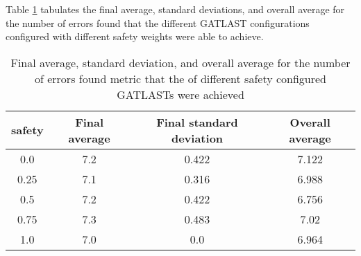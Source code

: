 Table \ref{tab:HP:GA:Safety:number of errors found} tabulates the final average, standard deviations, and overall average for the number of errors found that the different GATLAST configurations configured with different safety weights were able to achieve.
\begin{table}[tbh!]
\centering
\begin{adjustbox}{trim=0cm 0cm 0cm 0cm, clip=true}
\begin{tabular}{|c|c|c|c|}
\hline
safety & Final average & Final standard deviation & Overall average\\
\hline
0.0 & 7.2 & 0.422 & 7.122\\\hline
0.25 & 7.1 & 0.316 & 6.988\\\hline
0.5 & 7.2 & 0.422 & 6.756\\\hline
0.75 & 7.3 & 0.483 & 7.02\\\hline
1.0 & 7.0 & 0.0 & 6.964\\\hline
\end{tabular}
\end{adjustbox}
\caption{Final average, standard deviation, and overall average for the number of errors found metric that the of different safety configured GATLASTs were achieved}
\label{tab:HP:GA:Safety:number of errors found}
\end{table}